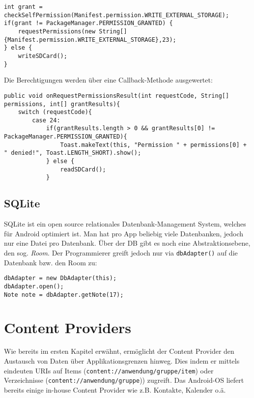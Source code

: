 \documentclass[a4paper, 11pt]{article}
\newcommand{\code}[1]{\texttt{#1}}
\begin{document}
\begin{lstlisting}[caption={Checken, ob man die Berechtigung hat und wenn nicht, Berechitung anfragen}]
int grant = checkSelfPermission(Manifest.permission.WRITE_EXTERNAL_STORAGE);
if(grant != PackageManager.PERMISSION_GRANTED) {
	requestPermissions(new String[]{Manifest.permission.WRITE_EXTERNAL_STORAGE},23);
} else {
	writeSDCard();
}
\end{lstlisting}

Die Berechtigungen werden über eine Callback-Methode ausgewertet:

\begin{lstlisting}[caption={Verarbeitung der Permission-Grants}]
public void onRequestPermissionsResult(int requestCode, String[] permissions, int[] grantResults){
	switch (requestCode){
		case 24:
			if(grantResults.length > 0 && grantResults[0] != PackageManager.PERMISSION_GRANTED){
				Toast.makeText(this, "Permission " + permissions[0] + " denied!", Toast.LENGTH_SHORT).show();
			} else {
				readSDCard();
			}
\end{lstlisting}

\subsection{SQLite}
SQLite ist ein open source relationales Datenbank-Management System, welches für Android optimiert ist. Man hat pro App beliebig viele Datenbanken, jedoch nur eine Datei pro Datenbank. Über der DB gibt es noch eine Abstraktionsebene, den sog. \textit{Room}. Der Programmierer greift jedoch nur via \code{dbAdapter()} auf die Datenbank bzw. den Room zu:

\begin{lstlisting}[caption={Anwendung des dbAdapters}]
dbAdapter = new DbAdapter(this);
dbAdapter.open();
Note note = dbAdapter.getNote(17);
\end{lstlisting}  

\section{Content Providers}
Wie bereits im ersten Kapitel erwähnt, ermöglicht der Content Provider den Austausch von Daten über Applikationsgrenzen hinweg. Dies indem er mittels eindeuten URIs auf Items (\code{content://anwendung/gruppe/item}) oder Verzeichnisse (\code{content://anwendung/gruppe})) zugreift. Das Android-OS liefert bereits einige in-house Content Provider wie z.B. Kontakte, Kalender o.ä. 
\end{document}

